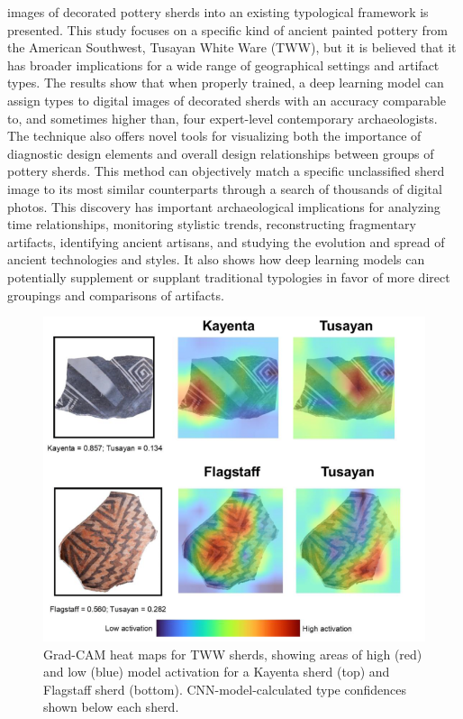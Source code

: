 \documentclass[journal]{IEEEtran}
\begin{document}
\begin{itemize}
		  images of decorated pottery sherds into an existing typological framework is presented. This study focuses on a specific kind of ancient painted pottery from the American Southwest, Tusayan White Ware (TWW), but it is believed that it has broader implications for a wide range of geographical settings and artifact types. The results show that when properly trained, a deep learning model can assign types to digital images of decorated sherds with an accuracy comparable to, and sometimes higher than, four expert-level contemporary archaeologists. The technique also offers novel tools for visualizing both the importance of diagnostic design elements and overall design relationships between groups of pottery sherds. This method can objectively match a specific unclassified sherd image to its most similar counterparts through a search of thousands of digital photos. This discovery has important archaeological implications for analyzing time relationships, monitoring stylistic trends, reconstructing fragmentary artifacts, identifying ancient artisans, and studying the evolution and spread of ancient technologies and styles. It also shows how deep learning models can potentially supplement or supplant traditional typologies in favor of more direct groupings and comparisons of artifacts.
		  \begin{figure}[htbp]
			\centering
			\includegraphics[width=1.0\linewidth]{./picture/fig6.png}
			\caption{ Grad-CAM heat maps for TWW sherds, showing areas of high (red) and low (blue) model activation for a Kayenta sherd (top) and Flagstaff sherd (bottom). 
			CNN-model-calculated type confidences shown below each sherd.}
		  \end{figure}
	\end{itemize}
\end{document}
